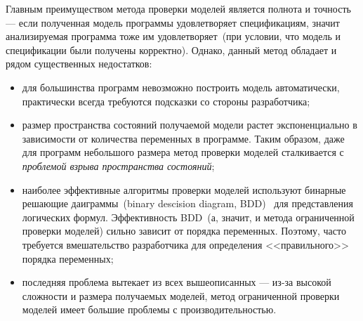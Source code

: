 Главным преимуществом метода проверки моделей является полнота и точность --- 
если полученная модель программы удовлетворяет спецификациям, значит 
анализируемая программа тоже им удовлетворяет~(при условии, что модель и 
спецификации были получены корректно). Однако, данный метод обладает и рядом
существенных недостатков:
\begin{itemize}
\item для большинства программ невозможно построить модель автоматически,
практически всегда требуются подсказки со стороны разработчика;

\item размер пространства состояний получаемой модели растет экспоненциально в 
зависимости от количества переменных в программе. Таким образом, даже для
программ небольшого размера метод проверки моделей сталкивается с 
\emph{проблемой взрыва пространства состояний};

\item наиболее эффективные алгоритмы проверки моделей используют бинарные
решающие даиграммы~(binary descision diagram, BDD)~\cite{bdds} для 
представления логических формул. Эффективность BDD~(а, значит, и метода
ограниченной проверки моделей) сильно зависит от порядка переменных. Поэтому,
часто требуется вмешательство разработчика для определения <<правильного>>
порядка переменных;

\item последняя проблема вытекает из всех вышеописанных --- из-за высокой
сложности и размера получаемых моделей, метод ограниченной проверки моделей
имеет большие проблемы с производительностью.
\end{itemize}

